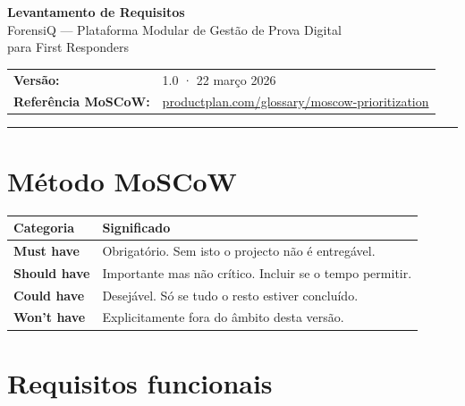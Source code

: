 \documentclass[a4paper,11pt]{article}
\begin{document}

\begin{center}
    {\LARGE\bfseries Levantamento de Requisitos}\\[0.8em]
    {\large ForensiQ --- Plataforma Modular de Gestão de Prova Digital\\
    para First Responders}\\[1.2em]
    \begin{tabular}{ll}
        \textbf{Versão:}    & 1.0 · 22 março 2026 \\
        \textbf{Referência MoSCoW:} &
            \href{https://www.productplan.com/glossary/moscow-prioritization/}%
                 {productplan.com/glossary/moscow-prioritization} \\
    \end{tabular}
\end{center}

\vspace{0.5em}
\hrule
\vspace{1.5em}

\section{Método MoSCoW}

\begin{longtable}{L{3cm} L{10cm}}
    \toprule
    \textbf{Categoria} & \textbf{Significado} \\
    \midrule
    \endhead
    \textbf{Must have}   & Obrigatório. Sem isto o projecto não é entregável. \\[0.3em]
    \textbf{Should have} & Importante mas não crítico. Incluir se o tempo permitir. \\[0.3em]
    \textbf{Could have}  & Desejável. Só se tudo o resto estiver concluído. \\[0.3em]
    \textbf{Won't have}  & Explicitamente fora do âmbito desta versão. \\
    \bottomrule
\end{longtable}

\section{Requisitos funcionais}
\end{document}
